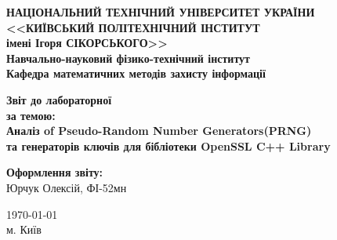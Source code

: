 \thispagestyle{empty}
\linespread{1.1}

\begin{center}
    {\bfseries\large
        НАЦІОНАЛЬНИЙ ТЕХНІЧНИЙ УНІВЕРСИТЕТ УКРАЇНИ \\
        <<КИЇВСЬКИЙ ПОЛІТЕХНІЧНИЙ ІНСТИТУТ \\
        імені Ігоря СІКОРСЬКОГО>> \\
        Навчально-науковий фізико-технічний інститут \\
        \medskip
        Кафедра математичних методів захисту інформації}
\end{center}

\begin{center}
\vspace{40mm}
{\bfseries\huge Звіт до лабораторної } \\
{\bfseries\Large за темою:} \\
{\bfseries\Large Аналіз of Pseudo-Random Number Generators(PRNG)} \\ 
{\bfseries\Large та генераторів ключів для бібліотеки OpenSSL C++ Library} \\
\end{center}

\vspace{55mm}
\begin{center}
    \hfill
    \begin{minipage}[t]{0.4\textwidth}
        \begin{flushright}
            \textbf{Оформлення звіту:} \\ 
                Юрчук Олексій, ФІ-52мн \\
        \end{flushright}
    \end{minipage}
\end{center}

\vfill
\begin{center}
    \today \\
    {м. Київ}
\end{center}

\newpage
{}

